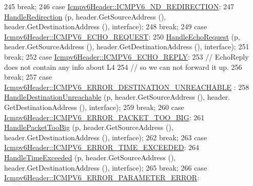 \begin{DoxyCode}
245       \textcolor{keywordflow}{break};
246     \textcolor{keywordflow}{case} \hyperlink{classns3_1_1Icmpv6Header_ad13fcbee075bf00f66ffbc57dfbecb70aeb20b493d906ead8f08096e0d9c120e8}{Icmpv6Header::ICMPV6\_ND\_REDIRECTION}:
247       \hyperlink{classns3_1_1Icmpv6L4Protocol_ac23066adbd141142fd8d6a86fa1cc4ef}{HandleRedirection} (p, header.GetSourceAddress (), header.GetDestinationAddress (), 
      interface);
248       \textcolor{keywordflow}{break};
249     \textcolor{keywordflow}{case} \hyperlink{classns3_1_1Icmpv6Header_ad13fcbee075bf00f66ffbc57dfbecb70aee9d19b2f71a1cb9b076d170cfcd4231}{Icmpv6Header::ICMPV6\_ECHO\_REQUEST}:
250       \hyperlink{classns3_1_1Icmpv6L4Protocol_ac3f01017288992311264ef54c57e539b}{HandleEchoRequest} (p, header.GetSourceAddress (), header.GetDestinationAddress (), 
      interface);
251       \textcolor{keywordflow}{break};
252     \textcolor{keywordflow}{case} \hyperlink{classns3_1_1Icmpv6Header_ad13fcbee075bf00f66ffbc57dfbecb70aa20a65a542b5851b5e711d036f1d0533}{Icmpv6Header::ICMPV6\_ECHO\_REPLY}:
253       \textcolor{comment}{// EchoReply does not contain any info about L4}
254       \textcolor{comment}{// so we can not forward it up.}
256 \textcolor{comment}{}      \textcolor{keywordflow}{break};
257     \textcolor{keywordflow}{case} \hyperlink{classns3_1_1Icmpv6Header_ad13fcbee075bf00f66ffbc57dfbecb70a888f534b20f4895d2c440cd1631eeaed}{Icmpv6Header::ICMPV6\_ERROR\_DESTINATION\_UNREACHABLE}
      :
258       \hyperlink{classns3_1_1Icmpv6L4Protocol_ac7cc1db0945e6dc5be05c82a4aa746be}{HandleDestinationUnreachable} (p, header.GetSourceAddress (), header.
      GetDestinationAddress (), interface);
259       \textcolor{keywordflow}{break};
260     \textcolor{keywordflow}{case} \hyperlink{classns3_1_1Icmpv6Header_ad13fcbee075bf00f66ffbc57dfbecb70ab681c1f821b9ac4ec7719dd3f6b72050}{Icmpv6Header::ICMPV6\_ERROR\_PACKET\_TOO\_BIG}:
261       \hyperlink{classns3_1_1Icmpv6L4Protocol_a5508e43a5549288270fc050b8b072f51}{HandlePacketTooBig} (p, header.GetSourceAddress (), header.GetDestinationAddress (),
       interface);
262       \textcolor{keywordflow}{break};
263     \textcolor{keywordflow}{case} \hyperlink{classns3_1_1Icmpv6Header_ad13fcbee075bf00f66ffbc57dfbecb70a25b87a102ea5fadefe07c5981cbf3446}{Icmpv6Header::ICMPV6\_ERROR\_TIME\_EXCEEDED}:
264       \hyperlink{classns3_1_1Icmpv6L4Protocol_ab83a1f9bbf51d2df18d893bb8b2f37ab}{HandleTimeExceeded} (p, header.GetSourceAddress (), header.GetDestinationAddress (),
       interface);
265       \textcolor{keywordflow}{break};
266     \textcolor{keywordflow}{case} \hyperlink{classns3_1_1Icmpv6Header_ad13fcbee075bf00f66ffbc57dfbecb70a021325d1f6f21b068d6d48d06c837906}{Icmpv6Header::ICMPV6\_ERROR\_PARAMETER\_ERROR}:

\end{DoxyCode}
